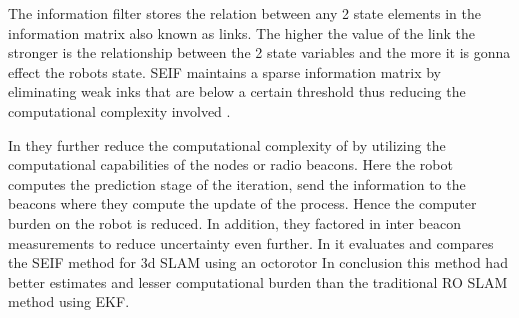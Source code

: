 \documentclass[conference]{IEEEtran}
\begin{document}
The information filter stores the relation between any 2 state elements in the information matrix also known as links. The higher the value of the link the stronger is the relationship between the 2 state variables and the more it is gonna effect the robots state. SEIF maintains a sparse information matrix by eliminating weak inks that are below a certain threshold thus reducing the computational complexity involved .

In \cite{Torres-Gonzalez2014} they further reduce the computational complexity of by utilizing the computational capabilities of the nodes or radio  beacons. Here the robot computes the prediction stage of the iteration, send the information to the beacons where they compute the update of the process. Hence the computer burden on the robot is reduced. In addition, they factored in inter beacon measurements to reduce uncertainty even further. In \cite{Torres-Gonzalez2017} it evaluates and compares  the SEIF method for 3d SLAM using an octorotor In conclusion this method had better estimates and lesser computational burden than the traditional RO SLAM method using EKF. 



	
	
	

	
\end{document}
